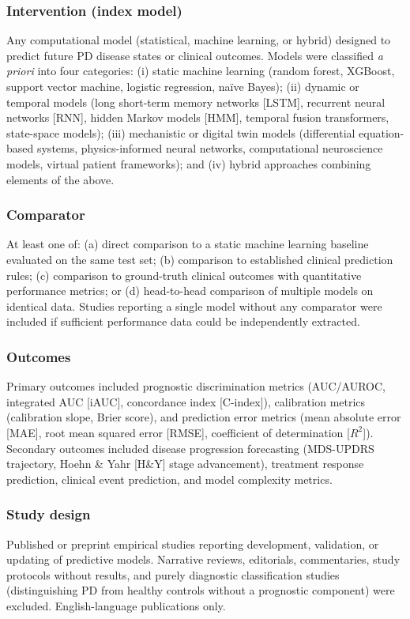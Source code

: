 \subsubsection{Intervention (index model)}
Any computational model (statistical, machine learning, or hybrid) designed to predict future PD disease states or clinical outcomes. Models were classified \textit{a priori} into four categories: (i) static machine learning (random forest, XGBoost, support vector machine, logistic regression, na\"ive Bayes); (ii) dynamic or temporal models (long short-term memory networks [LSTM], recurrent neural networks [RNN], hidden Markov models [HMM], temporal fusion transformers, state-space models); (iii) mechanistic or digital twin models (differential equation-based systems, physics-informed neural networks, computational neuroscience models, virtual patient frameworks); and (iv) hybrid approaches combining elements of the above.

\subsubsection{Comparator}
At least one of: (a) direct comparison to a static machine learning baseline evaluated on the same test set; (b) comparison to established clinical prediction rules; (c) comparison to ground-truth clinical outcomes with quantitative performance metrics; or (d) head-to-head comparison of multiple models on identical data. Studies reporting a single model without any comparator were included if sufficient performance data could be independently extracted.

\subsubsection{Outcomes}
Primary outcomes included prognostic discrimination metrics (AUC/AUROC, integrated AUC [iAUC], concordance index [C-index]), calibration metrics (calibration slope, Brier score), and prediction error metrics (mean absolute error [MAE], root mean squared error [RMSE], coefficient of determination [$R^2$]). Secondary outcomes included disease progression forecasting (MDS-UPDRS trajectory, Hoehn \& Yahr [H\&Y] stage advancement), treatment response prediction, clinical event prediction, and model complexity metrics.

\subsubsection{Study design}
Published or preprint empirical studies reporting development, validation, or updating of predictive models. Narrative reviews, editorials, commentaries, study protocols without results, and purely diagnostic classification studies (distinguishing PD from healthy controls without a prognostic component) were excluded. English-language publications only.


